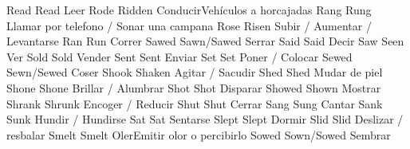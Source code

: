 	            {Read}{}	            {Read}{}                {Leer}{}
	            {Rode}{}	            {Ridden}{}              {Conducir}{Vehículos a horcajadas}
	            {Rang}{}	            {Rung}{}                {Llamar por telefono / Sonar una campana}{}
	            {Rose}{}	            {Risen}{}               {Subir / Aumentar / Levantarse}{}
	            {Ran}{}	                {Run}{}                 {Correr}{}
	            {Sawed}{}	            {Sawn/Sawed}{}          {Serrar}{}
	            {Said}{}	            {Said}{}                {Decir}{}
	            {Saw}{}	                {Seen}{}                {Ver}{}
	            {Sold}{}	            {Sold}{}                {Vender}{}
	            {Sent}{}	            {Sent}{}                {Enviar}{}
	            {Set}{}	                {Set}{}                 {Poner / Colocar}{}
	            {Sewed}{}	            {Sewn/Sewed}{}          {Coser}{}
	            {Shook}{}	            {Shaken}{}              {Agitar / Sacudir}{}
	            {Shed}{}	            {Shed}{}                {Mudar de piel}{}
	            {Shone}{}	            {Shone}{}               {Brillar / Alumbrar}{}
	            {Shot}{}	            {Shot}{}                {Disparar}{}
	            {Showed}{}	            {Shown}{}               {Mostrar}{}
	            {Shrank}{}	            {Shrunk}{}              {Encoger / Reducir}{}
	            {Shut}{}	            {Shut}{}                {Cerrar}{}
	            {Sang}{}	            {Sung}{}                {Cantar}{}
	            {Sank}{}	            {Sunk}{}                {Hundir / Hundirse}{}
	            {Sat}{}	                {Sat}{}                 {Sentarse}{}
	            {Slept}{}	            {Slept}{}               {Dormir}{}
	            {Slid}{}	            {Slid}{}                {Deslizar / resbalar}{}
	            {Smelt}{}	            {Smelt}{}               {Oler}{Emitir olor o percibirlo}
	            {Sowed}{}	            {Sown/Sowed}{}          {Sembrar}{}
